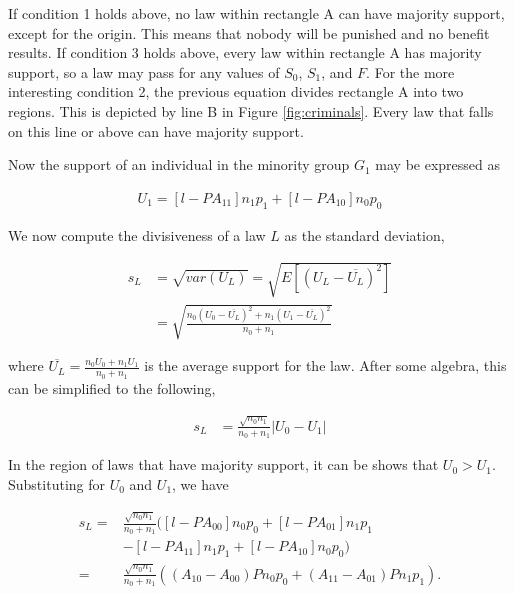If condition 1 holds above, no law within rectangle A can have majority support, except for the origin.  This means that nobody will be punished and no benefit results.  If condition 3 holds above, every law within rectangle A has majority support, so a law may pass for any values of $S_0$, $S_1$, and $F$.  For the more interesting condition 2, the previous equation divides rectangle A into two regions.  This is depicted by line B in Figure \ref{fig:criminals}.  Every law that falls on this line or above can have majority support.

Now the support of an individual in the minority group $G_1$ may be expressed as %

\begin{align}
U_1 =  [ l  -  P A_{11} ]n_1 p_1  + [l - P A_{10}] n_0 p_0  
\end{align}


We now compute the divisiveness of a law $L$ as the standard deviation,

\begin{align}
s_L &= \sqrt{var(U_L)}  =  \sqrt{E\left[ \left(U_L - \overline{U_L} \right)^2 \right] }  \\
&= \sqrt{ \frac{ n_0\left(U_0 - \overline{U_L}\right)^2 + n_1\left(U_1 - \overline{U_L} \right)^2 }{n_0+n_1}  }
\end{align}

where $\overline{U_L} = \frac{n_0 U_0 + n_1U_1 }{n_0 + n_1}$ is the average support for the law.  After some algebra, this can be simplified to the following,

\begin{align}
s_L &= \frac{\sqrt{n_0n_1}}{n_0 + n_1} \left| U_0 - U_1 \right|
\end{align}

In the region of laws that have majority support, it can be shows that $U_0 > U_1$. Substituting for $U_0$ and $U_1$, we have

\begin{align}
\nonumber s_L = &\frac{\sqrt{n_0n_1}}{n_0 + n_1} \big(  [ l  -  P A_{00} ]n_0 p_0  + [l - P A_{01}] n_1 p_1   \\
\nonumber & - [ l  -  P A_{11} ]n_1 p_1  + [l - P A_{10}] n_0 p_0   \big) \\
\nonumber = &\frac{\sqrt{n_0n_1}}{n_0 + n_1} \left(  ( A_{10} - A_{00} )P n_0p_0 + ( A_{11} - A_{01})P n_1p_1 \right).
\end{align}

